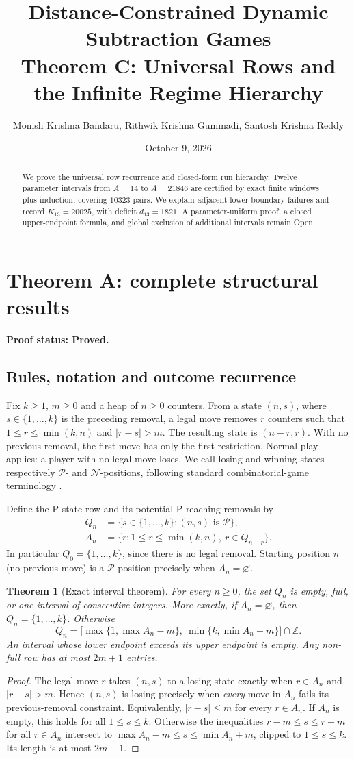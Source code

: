 \documentclass[11pt]{article}
\title{\textbf{Distance-Constrained Dynamic Subtraction Games}\\[0.4em]Theorem C: Universal Rows and the Infinite Regime Hierarchy}
\author{Monish Krishna Bandaru, Rithwik Krishna Gummadi, Santosh Krishna Reddy}
\date{October 9, 2026}
\newtheorem{theorem}{Theorem}[section]
\theoremstyle{remark}
\newcommand{\Pset}{\mathcal{P}}
\newcommand{\Nset}{\mathcal{N}}
\newcommand{\statusproved}{\textbf{Proof status: Proved.}}
\begin{document}
\maketitle
\begin{abstract}We prove the universal row recurrence and closed-form run hierarchy. Twelve parameter intervals from $A=14$ to $A=21846$ are certified by exact finite windows plus induction, covering $10323$ pairs. We explain adjacent lower-boundary failures and record $K_{13}=20025$, with deficit $d_{13}=1821$. A parameter-uniform proof, a closed upper-endpoint formula, and global exclusion of additional intervals remain Open.\end{abstract}
\tableofcontents
\section{Theorem A: complete structural results}\label{sec:A}
\statusproved
\subsection{Rules, notation and outcome recurrence}
Fix $k\ge1$, $m\ge0$ and a heap of $n\ge0$ counters. From a state $(n,s)$, where $s\in\{1,\ldots,k\}$ is the preceding removal, a legal move removes $r$ counters such that $1\le r\le\min(k,n)$ and $|r-s|>m$. The resulting state is $(n-r,r)$. With no previous removal, the first move has only the first restriction. Normal play applies: a player with no legal move loses. We call losing and winning states respectively $\Pset$- and $\Nset$-positions, following standard combinatorial-game terminology \cite{sprague1935,grundy1939,winningways2001}.

Define the P-state row and its potential P-reaching removals by
\begin{align}
Q_n&=\{s\in\{1,\ldots,k\}:(n,s)\text{ is }\Pset\},\\
A_n&=\{r:1\le r\le\min(k,n),\ r\in Q_{n-r}\}.
\end{align}
In particular $Q_0=\{1,\ldots,k\}$, since there is no legal removal. Starting position $n$ (no previous move) is a $\Pset$-position precisely when $A_n=\varnothing$.

\begin{theorem}[Exact interval theorem]\label{thm:Ainterval}
For every $n\ge0$, the set $Q_n$ is empty, full, or one interval of consecutive integers. More exactly, if $A_n=\varnothing$, then $Q_n=\{1,\ldots,k\}$. Otherwise
\[
\boxed{Q_n=\bigl[\max\{1,\max A_n-m\},\ \min\{k,\min A_n+m\}\bigr]\cap\mathbb Z.}
\]
An interval whose lower endpoint exceeds its upper endpoint is empty. Any non-full row has at most $2m+1$ entries.
\end{theorem}
\begin{proof}
The legal move $r$ takes $(n,s)$ to a losing state exactly when $r\in A_n$ and $|r-s|>m$. Hence $(n,s)$ is losing precisely when \emph{every} move in $A_n$ fails its previous-removal constraint. Equivalently, $|r-s|\le m$ for every $r\in A_n$. If $A_n$ is empty, this holds for all $1\le s\le k$. Otherwise the inequalities $r-m\le s\le r+m$ for all $r\in A_n$ intersect to $\max A_n-m\le s\le\min A_n+m$, clipped to $1\le s\le k$. Its length is at most $2m+1$.
\end{proof}
\end{document}
